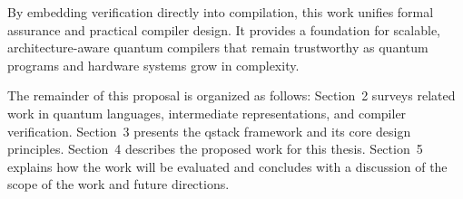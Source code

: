 By embedding verification directly into compilation, this work unifies formal assurance and practical compiler design. It provides a foundation for scalable, architecture-aware quantum compilers that remain trustworthy as quantum programs and hardware systems grow in complexity.

The remainder of this proposal is organized as follows: Section~2 surveys related work in quantum languages, intermediate representations, and compiler verification. Section~3 presents the qstack framework and its core design principles. Section~4 describes the proposed work for this thesis. Section~5 explains how the work will be evaluated and concludes with a discussion of the scope of the work and future directions.
